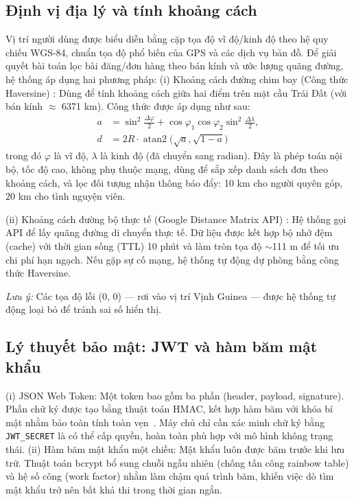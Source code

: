 \documentclass[../main.tex]{subfiles}%
\begin{document}
\subsection{Định vị địa lý và tính khoảng cách}
Vị trí người dùng được biểu diễn bằng cặp tọa độ vĩ độ/kinh độ theo hệ quy chiếu WGS-84, chuẩn tọa độ phổ biến của GPS và các dịch vụ bản đồ. Để giải quyết bài toán lọc bài đăng/đơn hàng theo bán kính và ước lượng quãng đường, hệ thống áp dụng hai phương pháp:
(i) Khoảng cách đường chim bay (Công thức Haversine) \cite{MovableTypeLatLong}: Dùng để tính khoảng cách giữa hai điểm trên mặt cầu Trái Đất (với bán kính $\approx$ 6371 km). Công thức được áp dụng như sau:
    \begin{equation}
    \begin{aligned}
    a &= \sin^2\!\frac{\Delta\varphi}{2}+\cos\varphi_1\cos\varphi_2\sin^2\!\frac{\Delta\lambda}{2},\\
    d &= 2R\cdot\operatorname{atan2}\!\big(\sqrt{a},\sqrt{1-a}\big)
    \end{aligned}
    \label{eq:haversine}
    \end{equation}
trong đó $\varphi$ là vĩ độ, $\lambda$ là kinh độ (đã chuyển sang radian). Đây là phép toán nội bộ, tốc độ cao, không phụ thuộc mạng, dùng để sắp xếp danh sách đơn theo khoảng cách, và lọc đối tượng nhận thông báo đẩy: 10 km cho người quyên góp, 20 km cho tình nguyện viên.

(ii) Khoảng cách đường bộ thực tế (Google Distance Matrix API) \cite{GoogleDistanceMatrixAPI}: Hệ thống gọi API để lấy quãng đường di chuyển thực tế. Dữ liệu được kết hợp bộ nhớ đệm (cache) với thời gian sống (TTL) 10 phút và làm tròn tọa độ $\sim$111 m để tối ưu chi phí hạn ngạch. Nếu gặp sự cố mạng, hệ thống tự động dự phòng bằng công thức Haversine.

\textit{Lưu ý:} Các tọa độ lỗi (0, 0) — rơi vào vị trí Vịnh Guinea — được hệ thống tự động loại bỏ để tránh sai số hiển thị.

\subsection{Lý thuyết bảo mật: JWT và hàm băm mật khẩu}
(i) JSON Web Token: Một token bao gồm ba phần (header, payload, signature). Phần chữ ký được tạo bằng thuật toán HMAC, kết hợp hàm băm với khóa bí mật nhằm bảo toàn tính toàn vẹn~\cite{RFC7519_JWT}. Máy chủ chỉ cần xác minh chữ ký bằng \texttt{JWT\_SECRET} là có thể cấp quyền, hoàn toàn phù hợp với mô hình không trạng thái.
(ii) Hàm băm mật khẩu một chiều: Mật khẩu luôn được băm trước khi lưu trữ. Thuật toán bcrypt bổ sung chuỗi ngẫu nhiên (chống tấn công rainbow table) và hệ số công (work factor) nhằm làm chậm quá trình băm, khiến việc dò tìm mật khẩu trở nên bất khả thi trong thời gian ngắn.
\end{document}

